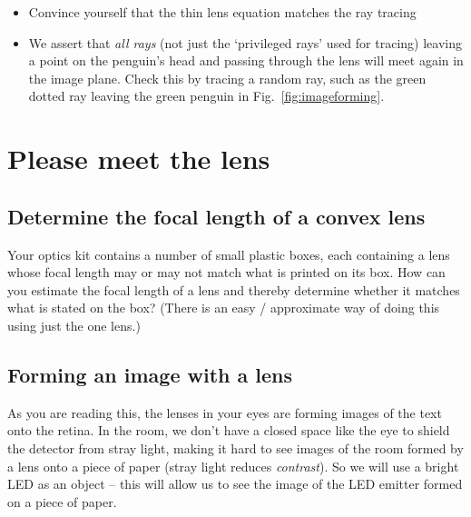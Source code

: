 \documentclass[a4paper]{report}
\begin{document}
	\begin{itemize}
	    \item Convince yourself that the thin lens equation matches the ray tracing
	    \item We assert that \emph{all rays} (not just the `privileged rays' used for tracing) leaving a point on the penguin's head and passing through the lens will meet again in the image plane. Check this by tracing a random ray, such as the green dotted ray leaving the green penguin in Fig.~\ref{fig:imageforming}. 
	\end{itemize}
	

    \clearpage

	\section{Please meet the lens}
	
    \subsection{Determine the focal length of a convex lens}
	\hypertarget{hintBack-focal_length}{}
	Your optics kit contains a number of small plastic boxes, each containing a lens whose focal length may or may not match what is printed on its box. 
	How can you estimate the focal length of a lens and thereby determine whether it matches what is stated on the box? 
	(There is an easy / approximate way of doing this using just the one lens.)

	
	
    \subsection{Forming an image with a lens}
	\hypertarget{hintBack-image}{}
	As you are reading this, the lenses in your eyes are forming images of the text onto the retina. 
	In the room, we don't have a closed space like the eye to shield the detector from stray light, making it hard to see images of the room formed by a lens onto a piece of paper (stray light reduces \emph{contrast}). 
	So we will use a bright LED as an object -- this will allow us to see the image of the LED emitter formed on a piece of paper.
	
\end{document}
